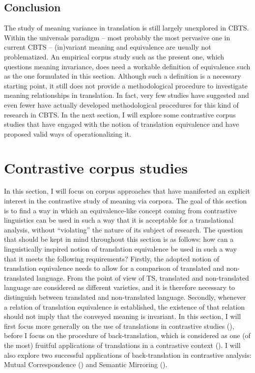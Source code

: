 \subsection{Conclusion}
\label{sec:2.2.5}  
The study of meaning variance in translation is still largely unexplored in CBTS. Within the universals paradigm – most probably the most pervasive one in current CBTS – (in)variant meaning and equivalence are usually not problematized. An empirical corpus study such as the present one, which questions meaning invariance, does need a workable definition of equivalence such as the one formulated in this section. Although such a definition is a necessary starting point, it still does not provide a methodological procedure to investigate meaning relationships in translation. In fact, very few studies have suggested and even fewer have actually developed methodological procedures for this kind of research in CBTS. In the next section, I will explore some contrastive corpus studies that have engaged with the notion of translation equivalence and have proposed valid ways of operationalizing it.

\section{Contrastive corpus studies}
\label{sec:2.3}  
In this section, I will focus on corpus approaches that have manifested an explicit interest in the contrastive study of meaning via corpora. The goal of this section is to find a way in which an equivalence-like concept coming from contrastive linguistics can be used in such a way that it is acceptable for a translational analysis, without ``violating'' the nature of its subject of research. The question that should be kept in mind throughout this section is as follows: how can a linguistically inspired notion of translation equivalence be used in such a way that it meets the following requirements? Firstly, the adopted notion of translation equivalence needs to allow for a comparison of translated and non-translated language. From the point of view of TS, translated and non-translated language are considered as different varieties, and it is therefore necessary to distinguish between translated and non-translated language. Secondly, whenever a relation of translation equivalence is established, the existence of that relation should not imply that the conveyed meaning is invariant. In this section, I will first focus more generally on the use of translations in contrastive studies (), before I focus on the procedure of back-translation, which is considered as one (of the most) fruitful applications of translations in a contrastive context (). I will also explore two successful applications of back-translation in contrastive analysis: Mutual Correspondence () and Semantic Mirroring ().

